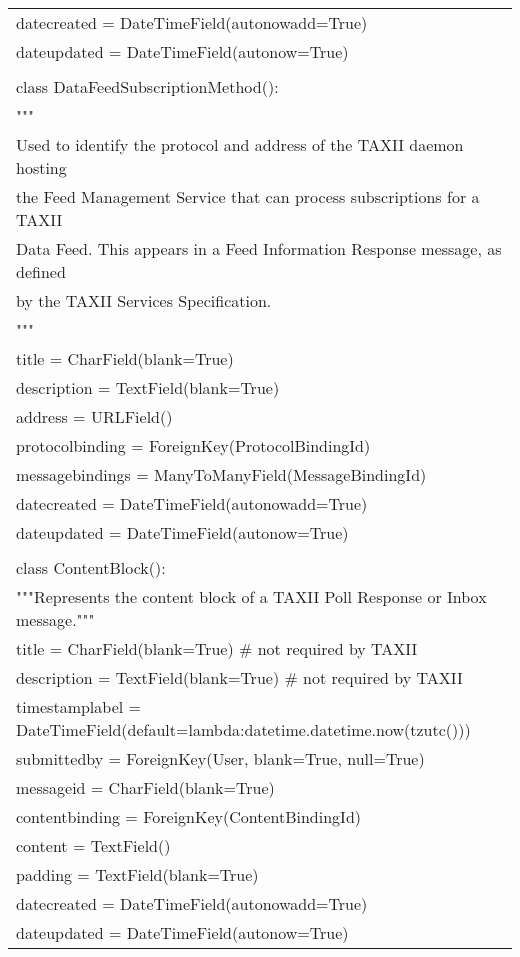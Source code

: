 \begin{center}
\begin{longtable}{|l|}
	    datecreated = DateTimeField(autonowadd=True)\\
	    dateupdated = DateTimeField(autonow=True)\\
	\\
	class DataFeedSubscriptionMethod():\\
	    """\\
	    Used to identify the protocol and address of the TAXII daemon hosting\\
	    the Feed Management Service that can process subscriptions for a TAXII\\
	    Data Feed. This appears in a Feed Information Response message, as defined\\
	    by the TAXII Services Specification.\\
	    """\\
	    title = CharField(blank=True)\\
	    description = TextField(blank=True)\\
	    address = URLField()\\
	    protocolbinding = ForeignKey(ProtocolBindingId)\\
	    messagebindings = ManyToManyField(MessageBindingId)\\
	    datecreated = DateTimeField(autonowadd=True)\\
	    dateupdated = DateTimeField(autonow=True)\\
	\\
	class ContentBlock():\\
	    """Represents the content block of a TAXII Poll Response or Inbox message."""\\
	    title = CharField(blank=True) # not required by TAXII\\
	    description = TextField(blank=True) # not required by TAXII\\
	    timestamplabel = DateTimeField(default=lambda:datetime.datetime.now(tzutc()))\\
	    submittedby = ForeignKey(User, blank=True, null=True)\\
	    messageid = CharField(blank=True)\\
	    contentbinding = ForeignKey(ContentBindingId)\\
	    content = TextField()\\
	    padding = TextField(blank=True)\\
	    datecreated = DateTimeField(autonowadd=True)\\
	    dateupdated = DateTimeField(autonow=True)\\

\end{longtable}
\end{center}
